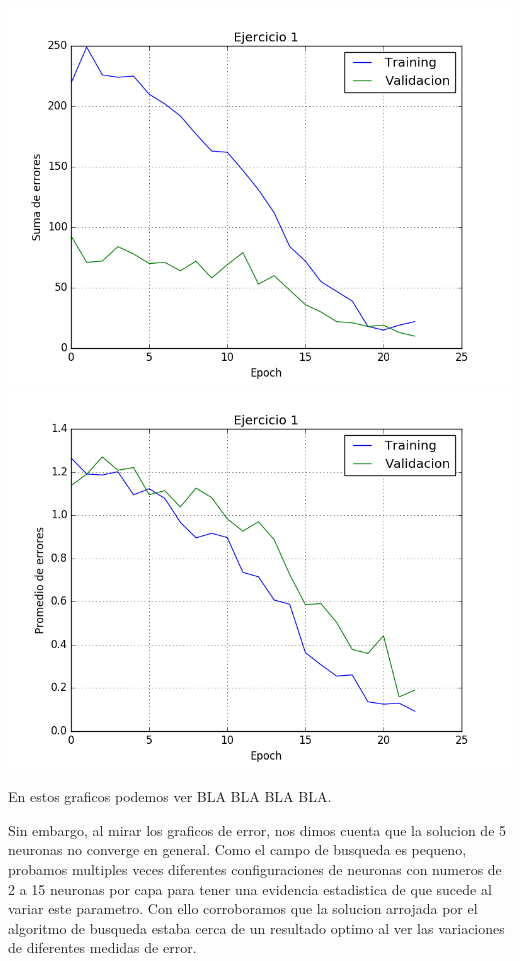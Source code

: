 \includegraphics[scale=0.4]{img/ej100109155sum}
\includegraphics[scale=0.4]{img/ej100109155mean}

En estos graficos podemos ver BLA BLA BLA BLA.


Sin embargo, al mirar los graficos de error, nos dimos cuenta que la solucion de 5 neuronas no converge en general.
Como el campo de busqueda es pequeno, probamos multiples veces diferentes configuraciones de neuronas con numeros de 2 a 15 neuronas por capa para tener una evidencia estadistica de que sucede al variar este parametro. Con ello corroboramos que la solucion arrojada por el algoritmo de busqueda estaba cerca de un resultado optimo al ver las variaciones de diferentes medidas de error. 

